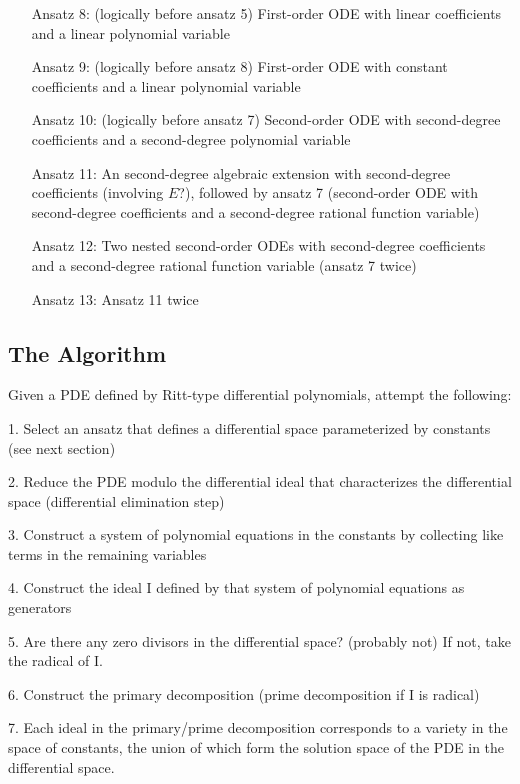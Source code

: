 \documentclass{article}
\begin{document}
\begin{itemize}
\item[Ansatz 8:] (logically before ansatz 5) First-order ODE with linear coefficients and a linear polynomial variable

\item[Ansatz 9:] (logically before ansatz 8) First-order ODE with constant coefficients and a linear polynomial variable

\item[Ansatz 10:] (logically before ansatz 7) Second-order ODE with second-degree coefficients and a second-degree polynomial variable

\item[Ansatz 11:] An second-degree algebraic extension with second-degree coefficients (involving $E$?),
followed by ansatz 7 (second-order ODE with second-degree coefficients and a second-degree rational function variable)

\item[Ansatz 12:] Two nested second-order ODEs with second-degree coefficients and a second-degree rational function variable (ansatz 7 twice)

\item[Ansatz 13:] Ansatz 11 twice

\end{itemize}

\subsection*{The Algorithm}

Given a PDE defined by Ritt-type differential polynomials, attempt the following:

1. Select an ansatz that defines a differential space parameterized by constants (see next section)

2. Reduce the PDE modulo the differential ideal that characterizes the differential space (differential elimination step)

3. Construct a system of polynomial equations in the constants by collecting like terms in the remaining variables

4. Construct the ideal I defined by that system of polynomial equations as generators

5. Are there any zero divisors in the differential space? (probably not)  If not, take the radical of I.

6. Construct the primary decomposition (prime decomposition if I is radical)

7. Each ideal in the primary/prime decomposition corresponds to a variety in the space of constants,
the union of which form the solution space of the PDE in the differential space.
\end{document}

